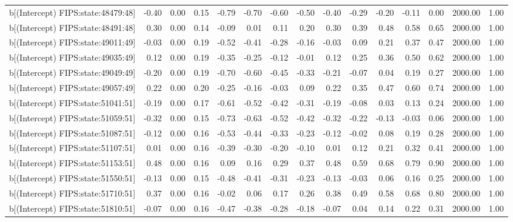 \begin{table}[ht]
\begin{tabular}{rrrrrrrrrrrrrrr}
  b[(Intercept) FIPS:state:48479:48] & -0.40 & 0.00 & 0.15 & -0.79 & -0.70 & -0.60 & -0.50 & -0.40 & -0.29 & -0.20 & -0.11 & 0.00 & 2000.00 & 1.00 \\ 
  b[(Intercept) FIPS:state:48491:48] & 0.30 & 0.00 & 0.14 & -0.09 & 0.01 & 0.11 & 0.20 & 0.30 & 0.39 & 0.48 & 0.58 & 0.65 & 2000.00 & 1.00 \\ 
  b[(Intercept) FIPS:state:49011:49] & -0.03 & 0.00 & 0.19 & -0.52 & -0.41 & -0.28 & -0.16 & -0.03 & 0.09 & 0.21 & 0.37 & 0.47 & 2000.00 & 1.00 \\ 
  b[(Intercept) FIPS:state:49035:49] & 0.12 & 0.00 & 0.19 & -0.35 & -0.25 & -0.12 & -0.01 & 0.12 & 0.25 & 0.36 & 0.50 & 0.62 & 2000.00 & 1.00 \\ 
  b[(Intercept) FIPS:state:49049:49] & -0.20 & 0.00 & 0.19 & -0.70 & -0.60 & -0.45 & -0.33 & -0.21 & -0.07 & 0.04 & 0.19 & 0.27 & 2000.00 & 1.00 \\ 
  b[(Intercept) FIPS:state:49057:49] & 0.22 & 0.00 & 0.20 & -0.25 & -0.16 & -0.03 & 0.09 & 0.22 & 0.35 & 0.47 & 0.60 & 0.74 & 2000.00 & 1.00 \\ 
  b[(Intercept) FIPS:state:51041:51] & -0.19 & 0.00 & 0.17 & -0.61 & -0.52 & -0.42 & -0.31 & -0.19 & -0.08 & 0.03 & 0.13 & 0.24 & 2000.00 & 1.00 \\ 
  b[(Intercept) FIPS:state:51059:51] & -0.32 & 0.00 & 0.15 & -0.73 & -0.63 & -0.52 & -0.42 & -0.32 & -0.22 & -0.13 & -0.03 & 0.06 & 2000.00 & 1.00 \\ 
  b[(Intercept) FIPS:state:51087:51] & -0.12 & 0.00 & 0.16 & -0.53 & -0.44 & -0.33 & -0.23 & -0.12 & -0.02 & 0.08 & 0.19 & 0.28 & 2000.00 & 1.00 \\ 
  b[(Intercept) FIPS:state:51107:51] & 0.01 & 0.00 & 0.16 & -0.39 & -0.30 & -0.20 & -0.10 & 0.01 & 0.12 & 0.21 & 0.32 & 0.41 & 2000.00 & 1.00 \\ 
  b[(Intercept) FIPS:state:51153:51] & 0.48 & 0.00 & 0.16 & 0.09 & 0.16 & 0.29 & 0.37 & 0.48 & 0.59 & 0.68 & 0.79 & 0.90 & 2000.00 & 1.00 \\ 
  b[(Intercept) FIPS:state:51550:51] & -0.13 & 0.00 & 0.15 & -0.48 & -0.41 & -0.31 & -0.23 & -0.13 & -0.03 & 0.06 & 0.16 & 0.25 & 2000.00 & 1.00 \\ 
  b[(Intercept) FIPS:state:51710:51] & 0.37 & 0.00 & 0.16 & -0.02 & 0.06 & 0.17 & 0.26 & 0.38 & 0.49 & 0.58 & 0.68 & 0.80 & 2000.00 & 1.00 \\ 
  b[(Intercept) FIPS:state:51810:51] & -0.07 & 0.00 & 0.16 & -0.47 & -0.38 & -0.28 & -0.18 & -0.07 & 0.04 & 0.14 & 0.22 & 0.31 & 2000.00 & 1.00 \\ 

\end{tabular}
\end{table}
